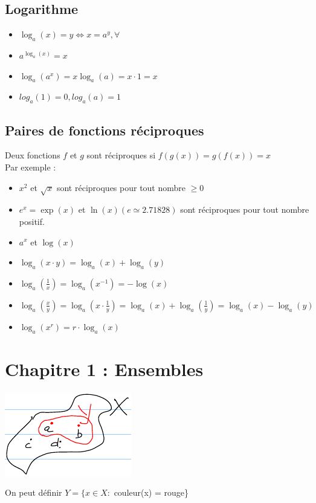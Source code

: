 \documentclass[12pt,a4paper]{article}
\begin{document}
\subsection{Logarithme}
\begin{itemize}
	\item $\log_a(x) = y \iff x =  a^y,\forall$
	\item $a^{\log_a(x)} = x$
	\item $\log_a(a^x) = x\log_a(a) = x \cdot 1 = x$
	\item $log_a(1) = 0, log_a(a) = 1$
\end{itemize}

\subsection{Paires de fonctions réciproques}
Deux fonctions $f$ et $g$ sont réciproques si $f(g(x)) = g(f(x)) = x$\\
Par exemple :
\begin{itemize}
\item $x^2$ et $\sqrt{x}$ sont réciproques pour tout nombre $\geq 0$
\item $e^x = \exp(x)$ et $\ln(x) (e \simeq 2.71828)$ sont réciproques pour tout nombre positif.
\item $a^x$ et $\log(x)$
\item $\log_a(x\cdot y) = \log_a(x) + \log_a(y)$
\item $\log_a(\frac{1}{x}) = \log_a(x^{-1}) = -\log(x)$
\item $\log_a(\frac{x}{y}) = \log_a(x \cdot \frac{1}{y}) =\log_a(x) + \log_a(\frac{1}{y}) = \log_a(x) - \log_a(y)$
\item $\log_a(x^r) = r\cdot \log_a(x)$
\end{itemize}

\section{Chapitre 1 : Ensembles}
\setcounter{equation}{0}
\begin{center}
\includegraphics[scale=1]{illustrations_Analyse/ensemble}\\	
\end{center}
On peut définir $Y =\{x \in X :$ couleur(x) = rouge\}
\end{document}
